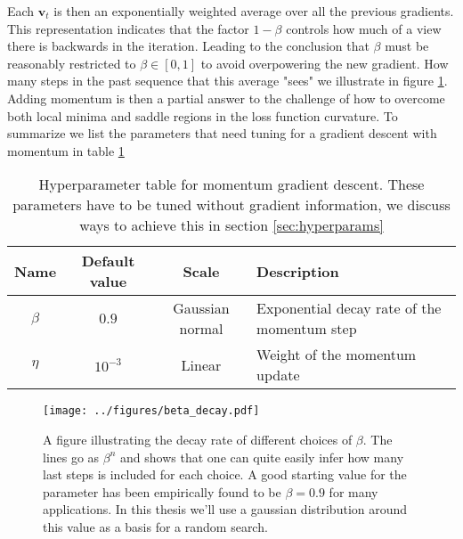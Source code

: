 \noindent Each $\mathbf{v}_t$ is then an exponentially weighted average over all the previous gradients. This representation indicates that the factor $1-\beta$ controls how much of a view there is backwards in the iteration. Leading to the conclusion that $\beta$ must be reasonably restricted to $\beta \in [0, 1]$ to avoid overpowering the new gradient. How many steps in the past sequence that this average "sees" we illustrate in figure \ref{fig:beta}. Adding momentum is then a partial answer to the challenge of how to overcome both local minima and saddle regions in the loss function curvature. To summarize we list the parameters that need tuning for a gradient descent with momentum in table \ref{tab:momentum}

\begin{table}
\centering
\caption{Hyperparameter table for momentum gradient descent. These parameters have to be tuned without gradient information, we discuss ways to achieve this in section \ref{sec:hyperparams}}\label{tab:momentum}
\begin{tabular}{cccl}
\toprule
Name &Default value & Scale  & Description\\
\midrule
$\beta$  & $0.9$ & Gaussian normal & Exponential decay rate of the momentum step\\
$\eta$  & $10^{-3}$ & Linear & Weight of the momentum update \\
\bottomrule
\end{tabular}
\end{table}


\begin{figure}
\centering
\texttt{[image: ../figures/beta\_decay.pdf]}
\caption[Exponential decay in momentum gradient descent]{A figure illustrating the decay rate of different choices of $\beta$. The lines go as $\beta^n$ and shows that one can quite easily infer how many last steps is included for each choice. A good starting value for the parameter has been empirically found to be $\beta=0.9$ for many applications. In this thesis we'll use a gaussian distribution around this value as a basis for a random search.}\label{fig:beta}
\end{figure}

